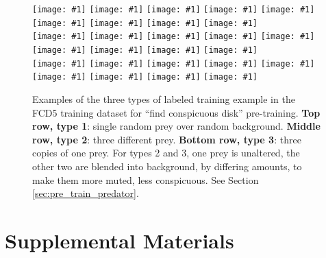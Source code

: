 \documentclass[acmtog]{acmart}
\begin{document}
\begin{figure}
    \newcommand{\ig}[1]{\texttt{[image: \#1]}}
    \ig{20220303_UVSfqCzewt_38_20.png}
    \hfill
    \ig{20220303_SBWaLRHOzk_56_33.png}
    \hfill
    \ig{20220303_bUMqcbutgJ_25_78.png}
    \hfill
    \ig{20220303_HZzUzWWqcC_54_28.png}
    \hfill
    \ig{20220303_inuPKUxnHQ_72_71.png}
    \hfill
    \ig{20220303_RRGCwhmcJc_101_84.png}
    \hfill
    \ig{20220303_PYinyJAWaj_61_60.png}
    \hfill
    \ig{20220303_TNXfhQtzYa_92_91.png}
    \hfill
    \ig{20220303_cDMtFaTYKk_63_54.png}
    \\
    \vspace{0.1cm}
    \ig{20220303_wIRPERwSCh_49_63.png}
    \hfill
    \ig{20220303_edDsCjbHdf_61_92.png}
    \hfill
    \ig{20220303_fGMFBgMQDX_93_86.png}
    \hfill
    \ig{20220303_jQREPLQyuL_33_39.png}
    \hfill
    \ig{20220303_ijBOHTccYX_104_101.png}
    \hfill
    \ig{20220303_KAoOFAqFyU_80_58.png}
    \hfill
    \ig{20220303_NExMwxEbzU_85_92.png}
    \hfill
    \ig{20220303_kpcUyhHXOh_91_98.png}
    \hfill
    \ig{20220303_oWPwPGkcSb_82_22.png}
    \\
    \vspace{0.1cm}
    \ig{20220303_uAEPxMZbeo_83_45.png}
    \hfill
    \ig{20220303_cADfBauZUV_47_32.png}
    \hfill
    \ig{20220303_YAMfudJxeH_30_84.png}
    \hfill
    \ig{20220303_JeyBgDfMcN_40_82.png}
    \hfill
    \ig{20220303_OaOJaByhbU_90_55.png}
    \hfill
    \ig{20220303_mhYpDjxaKf_78_57.png}
    \hfill
    \ig{20220303_ASsEgFUlly_23_60.png}
    \hfill
    \ig{20220303_nzgItDrYqT_71_99.png}
    \hfill
    \ig{20220303_QuHYtnPora_72_73.png}
    \caption{Examples of the three types of labeled training example in the FCD5 training dataset for “find conspicuous disk” pre-training. \textbf{Top row, type 1}: single random prey over random background. \textbf{Middle row, type 2}: three different prey. \textbf{Bottom row, type 3}: three copies of one prey. For types 2 and 3, one prey is unaltered, the other two are blended into background, by differing amounts, to make them more muted, less conspicuous. See Section \ref{sec:pre_train_predator}.}
    \label{fig:fcd5_examples}
\end{figure}


\appendix
\newpage
\onecolumn
\section{Supplemental Materials}
\end{document}
